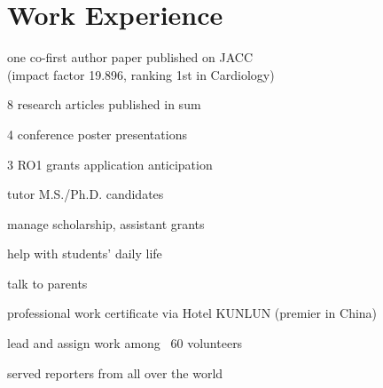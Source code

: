 \documentclass[]{junhu_resume}
\begin{document}
\begin{minipage}[t]{0.66\textwidth} 


\section{Work Experience}
\vspace{\topsep} %
\begin{tightemize}
\item one co-first author paper published on JACC\\ (impact factor 19.896, ranking 1st in Cardiology)
\item 8 research articles published in sum
\item 4 conference poster presentations
\item 3 RO1 grants application anticipation
\item tutor M.S./Ph.D. candidates
\end{tightemize}
\sectionsep

\begin{tightemize}
\item manage scholarship, assistant grants
\item help with students' daily life
\item talk to parents
\end{tightemize}
\sectionsep

\begin{tightemize}
\item professional work certificate via Hotel KUNLUN (premier in China)
\item lead and assign work among ~60 volunteers
\item served reporters from all over the world 
\end{tightemize}
\sectionsep




\end{minipage}
\end{document}
